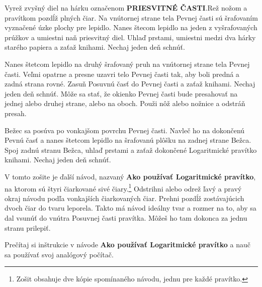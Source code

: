\begin{multicols*}{3}
{Vyrež zvyšný diel na hárku označenom \textbf{PRIESVITNÉ ČASTI}.\footnotemark[\value{footnote}] Rež nožom a pravítkom pozdĺž plných čiar. Na vnútornej strane tela Pevnej časti sú šrafovaním vyznačené úzke plochy pre lepidlo. Nanes štecom lepidlo na jeden z vyšrafovaných prúžkov a umiestni naň priesvitný diel. Uhlaď prstami, umiestni medzi dva hárky starého papiera a zaťaž knihami. Nechaj jeden deň schnúť.


Nanes štetcom lepidlo na druhý šrafovaný pruh na vnútornej strane tela Pevnej časti. Veľmi opatrne a presne uzavri telo Pevnej časti tak, aby boli predná a zadná strana rovné. Zasuň Posuvnú časť do Pevnej časti a zaťaž knihami. Nechaj jeden deň schnúť.
Môže sa stať, že okienko Pevnej časti bude presahovať na jednej alebo druhej strane, alebo na oboch. Použi nôž alebo nožnice a odstráň presah.


Bežec sa posúva po vonkajšom povrchu Pevnej časti. Navleč ho na dokončenú Pevnú časť a nanes štetcom lepidlo na šrafovanú plôšku na zadnej strane Bežca. Spoj zadnú stranu Bežca, uhlaď prstami a zaťaž dokončené Logaritmické pravítko knihami. Nechaj jeden deň schnúť.


V tomto zošite je ďalší návod, nazvaný \textbf{Ako používať Logaritmické pravítko}, na ktorom sú štyri čiarkované sivé čiary.\footnote{Zošit obsahuje dve kópie spomínaného návodu, jednu pre každé pravítko.} Odstrihni alebo odrež ľavý a pravý okraj návodu podľa vonkajších čiarkovaných čiar. Prehni pozdĺž zostávajúcich dvoch čiar do tvaru leporela. Takto má návod ideálny tvar a rozmer na to, aby sa dal vsunúť do vnútra Posuvnej časti pravítka. Môžeš ho tam dokonca za jednu stranu prilepiť.


Prečítaj si inštrukcie v návode \textbf{Ako používať Logaritmické pravítko} a nauč sa používať svoj analógový počítač.

  }
  \end{multicols*}
  

